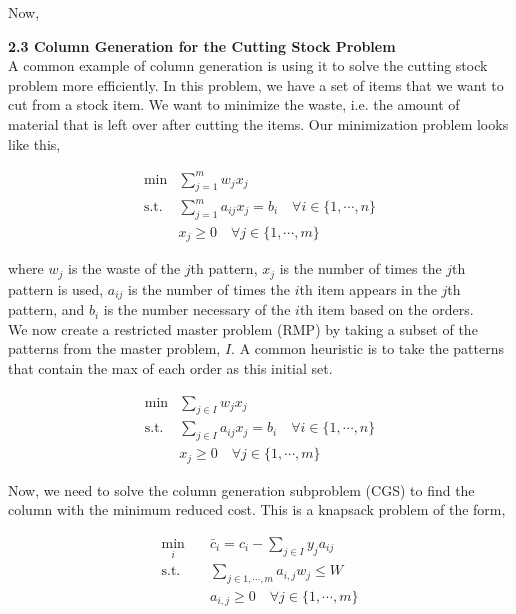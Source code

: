 \documentclass[11pt]{article}
\begin{document}
\newpage 

\noindent Now,


\newpage

\noindent \textbf{2.3 Column Generation for the Cutting Stock Problem}
\\

\noindent A common example of column generation is using it to solve the cutting stock problem more efficiently. In this problem, we have a set of items that we want to cut from a stock item. We want to minimize the waste, i.e. the amount of material that is left over after cutting the items. Our minimization problem looks like this,

$$
\begin{aligned}
    \min & \sum_{j=1}^{m} w_j x_j \\
    \text{s.t.} & \sum_{j=1}^{m} a_{ij} x_j = b_i \quad \forall i \in \{1, \cdots, n\} \\
    & x_j \geq 0 \quad \forall j \in \{1, \cdots, m\}
\end{aligned}
$$

\noindent where $w_j$ is the waste of the $j$th pattern, $x_j$ is the number of times the $j$th pattern is used, $a_{ij}$ is the number of times the $i$th item appears in the $j$th pattern, and $b_i$ is the number necessary of the $i$th item based on the orders.
\\

\noindent We now create a restricted master problem (RMP) by taking a subset of the patterns from the master problem, $I$. A common heuristic is to take the patterns that contain the max of each order as this initial set.

$$
\begin{aligned}
    \min & \sum_{j \in I} w_j x_j \\
    \text{s.t.} & \sum_{j \in I} a_{ij} x_j = b_i \quad \forall i \in \{1, \cdots, n\} \\
    & x_j \geq 0 \quad \forall j \in \{1, \cdots, m\}
\end{aligned}
$$

\noindent Now, we need to solve the column generation subproblem (CGS) to find the column with the minimum reduced cost. This is a knapsack problem of the form,

$$
\begin{aligned}
    \min_i \quad & \bar{c}_i = c_i - \sum_{j \in I} y_j a_{ij} \\
    \text{s.t.} \quad  & \sum_{j \in {1,\cdots,m}} a_{i,j} w_j \leq W \\
    & a_{i,j} \geq 0 \quad \forall j \in \{1, \cdots, m\}
\end{aligned}
$$
\end{document}
